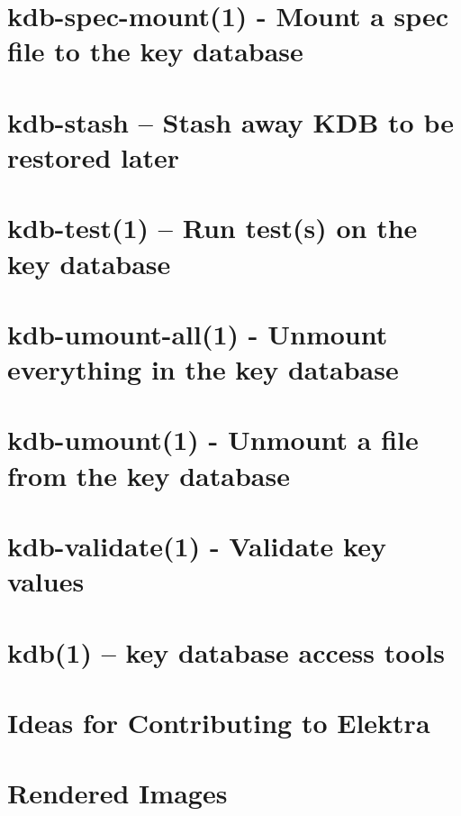 \let\mypdfximage\pdfximage\def\pdfximage{\immediate\mypdfximage}\documentclass[twoside]{book}
\newcommand{\+}{\discretionary{\mbox{\scriptsize$\hookleftarrow$}}{}{}}
\begin{document}
\chapter{kdb-\/spec-\/mount(1) -\/ Mount a spec file to the key database}
\label{doc_help_kdb-spec-mount_md}

\chapter{kdb-\/stash -- Stash away KDB to be restored later}
\label{doc_help_kdb-stash_md}

\chapter{kdb-\/test(1) -- Run test(s) on the key database}
\label{doc_help_kdb-test_md}

\chapter{kdb-\/umount-\/all(1) -\/ Unmount everything in the key database}
\label{doc_help_kdb-umount-all_md}

\chapter{kdb-\/umount(1) -\/ Unmount a file from the key database}
\label{doc_help_kdb-umount_md}

\chapter{kdb-\/validate(1) -\/ Validate key values}
\label{doc_help_kdb-validate_md}

\chapter{kdb(1) -- key database access tools}
\label{doc_help_kdb_md}

\chapter{Ideas for Contributing to Elektra}
\label{doc_IDEAS_md}

\chapter{Rendered Images}
\label{doc_images_README_md}

\end{document}
